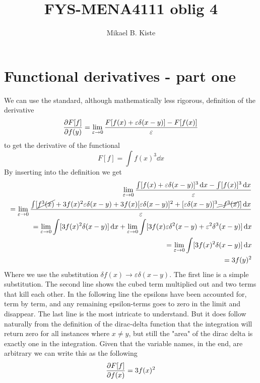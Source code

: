 \documentclass{article}
\author{Mikael B. Kiste}
\title{FYS-MENA4111 oblig 4}
\begin{document}
	\maketitle
	\tableofcontents
	\newpage
	
	\section{Functional derivatives - part one}
	We can use the standard, although mathematically less rigorous, definition of the derivative
	\begin{equation}
		\pdv{F[f]}{f(y)} = \lim\limits_{\varepsilon\to 0}\frac{F[f(x)+\varepsilon\delta(x-y)]-F[f(x)]}{\varepsilon}
	\end{equation}
	to get the derivative of the functional $$F[f] = \int f(x)^3\dd{x}$$
	By inserting into the definition we get
	\begin{align*}
		\lim\limits_{\varepsilon\to 0} \frac{\int[f(x)+\varepsilon\delta(x-y)]^3\dd{x}-\int[f(x)]^3\dd{x}}{\varepsilon}\\
		= \lim\limits_{\varepsilon\to 0} \frac{
		\int[ \cancel{f^3(x)} + 3f(x)^2\varepsilon\delta(x-y) + 3f(x)[\varepsilon\delta(x-y)]^2  + [\varepsilon\delta(x-y)]^3 \cancel{-  f^3(x)}]\dd{x}} {\varepsilon} \\
		= \lim\limits_{\varepsilon\to 0}
		\int[3f(x)^2\delta(x-y)]\dd{x} + \lim\limits_{\varepsilon\to 0} \int[3f(x)\varepsilon\delta^2(x-y)+\varepsilon^2\delta^3(x-y)]\dd{x}\\
		= \lim\limits_{\varepsilon\to 0} \int[3f(x)^2\delta(x-y)]\dd{x}\\
		= 3f(y)^2
	\end{align*}
	Where we use the substitution $\delta f(x) \to \varepsilon\delta(x-y)$. The first line is a simple substitution. The second line shows the cubed term multiplied out and two terms that kill each other. In the following line the epsilons have been accounted for, term by term, and any remaining epsilon-terms goes to zero in the limit and disappear. The last line is the most intricate to understand. But it does follow naturally from the definition of the dirac-delta function that the integration will return zero for all instances where $x\neq y$, but still the "area" of the dirac delta is exactly one in the integration. Given that the variable names, in the end, are arbitrary we can write this as the following
	\begin{equation*}
		\pdv{F[f]}{f(x)}=3f(x)^2
	\end{equation*}
	
\end{document}

